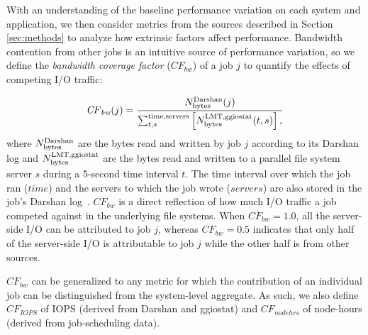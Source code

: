With an understanding of the baseline performance variation on each system and application, we then consider metrics from the sources described in Section \ref{sec:methods} to analyze how extrinsic factors affect performance.
Bandwidth contention from other jobs is an intuitive source of performance variation, so we define the \emph{bandwidth coverage factor} ($\mathit{CF}_{\mathit{bw}}$) of a job $j$ to quantify the effects of competing I/O traffic:

\begin{equation} \label{eq:cf}
    \mathit{CF}_{\mathit{bw}}(j) = \frac{N_{\textup{bytes}}^{\textup{Darshan}}(j)}
    {\sum_{t,s}^{\textup{time,servers}}
    \left [ N_{\textup{bytes}}^{\textup{LMT,ggiostat}}(t,s) \right ] , }
\end{equation}
%
where 
$N_{\textup{bytes}}^{\textup{Darshan}}$ are the bytes read and written by job $j$ according to its Darshan log and 
$N_{\textup{bytes}}^{\textup{LMT,ggiostat}}$ are the bytes read and written to a parallel file system server $s$ during a 5-second time interval $t$.
The time interval over which the job ran ($\mathit{time}$) and the servers to which the job wrote ($\mathit{servers}$) are also stored in the job's Darshan log~\cite{snyder2016modular}.
$\mathit{CF}_{\mathit{bw}}$ is a direct reflection of how much I/O traffic a job competed against in the underlying file systems.
When $\mathit{CF}_{\mathit{bw}} = 1.0$, all the server-side I/O can be attributed to job $j$, whereas $\mathit{CF}_{\mathit{bw}} = 0.5$ indicates that only half of the server-side I/O is attributable to job $j$ while the other half is from other sources.

$\mathit{CF}_{\mathit{bw}}$ can be generalized to any metric for which the contribution of an individual job can be distinguished from the system-level aggregate.
As such, we also define $\mathit{CF}_{\mathit{IOPS}}$ of IOPS (derived from Darshan and ggiostat) and $\mathit{CF}_{\mathit{nodehrs}}$ of node-hours (derived from job-scheduling data).



